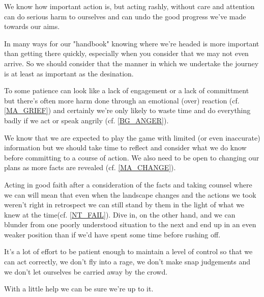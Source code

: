 \cleardoublepage
\begin{multicols}{2}

We know how important action is, but acting rashly, without care and attention can do serious harm to ourselves and can undo the good progress we've made towards our aims.

In many ways for our "handbook" knowing where we're headed is more important than getting there quickly, especially when you consider that we may not even arrive. So we should consider that the manner in which we undertake the journey is at least as important as the desination.

To some patience can look like a lack of engagement or a lack of committment but there's often more harm done through an emotional (over) reaction (cf. \ref{MA_GRIEF}) and certainly we're only likely to waste time and do everything badly if we act or speak angrily (cf. \ref{BG_ANGER}).

We know that we are expected to play the game with limited (or even inaccurate) information but we should take time to reflect and consider what we do know before committing to a course of action. We also need to be open to changing our plans as more facts are revealed (cf. \ref{MA_CHANGE}).  

Acting in good faith after a consideration of the facts and taking counsel where we can will mean that even when the landscape changes and the actions we took weren't right in retrospect we can still stand by them in the light of what we knew at the time(cf. \ref{NT_FAIL}). Dive in, on the other hand, and we can blunder from one poorly understood situation to the next and end up in an even weaker position than if we'd have spent some time before rushing off. 

It's a lot of effort to be patient enough to maintain a level of control so that we can act correctly, we don't fly into a rage, we don't make snap judgements and we don't let ourselves be carried away by the crowd.

With a little help we can be sure we're up to it.

\end{multicols}
\clearpage
